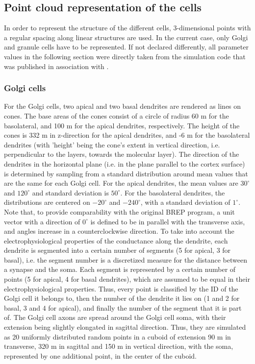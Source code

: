 \documentclass[12pt]{report}
\begin{document}
\subsection{Point cloud representation of the cells}

In order to represent the structure of the different cells, 3-dimensional points with a regular spacing along linear structures are used. In the current case, only Golgi and granule cells have to be represented. If not declared differently, all parameter values in the following section were directly taken from the simulation code that was published in association with \cite{r:Sudha17}.
 

\subsubsection{Golgi cells}
For the Golgi cells, two apical and two basal dendrites are rendered as lines on cones. The base areas of the cones consist of a circle of radius 60 \textmu m for the basolateral, and 100 \textmu m for the apical dendrites, respectively. The height of the cones is 332 \textmu m in z-direction for the apical dendrites, and -6 \textmu m for the basolateral dendrites (with 'height' being the cone's extent in vertical direction, i.e. perpendicular to the layers, towards the molecular layer). The direction of the dendrites in the horizontal plane (i.e. in the plane parallel to the cortex surface) is determined by sampling from a standard distribution around mean values that are the same for each Golgi cell. For the apical dendrites, the mean values are $30^{\circ}$ and $120^{\circ}$ and standard deviation is $50^{\circ}$. For the basolateral dendrites, the distributions are centered on $-20^{\circ}$ and $-240^{\circ}$, with a standard deviation of $1^{\circ}$. Note that, to provide comparability with the original BREP program, a unit vector with a direction of $0^{\circ}$ is defined to be in parallel with the transverse axis, and angles increase in a counterclockwise direction. To take into account the electrophysiological properties of the conductance along the dendrite, each dendrite is segmented into a certain number of segments (5 for apical, 3 for basal), i.e. the segment number is a discretized measure for the distance between a synapse and the soma. Each segment is represented by a certain number of points (5 for apical, 4 for basal dendrites), which are assumed to be equal in their electrophysiological properties. Thus, every point is classified by the ID of the Golgi cell it belongs to, then the number of the dendrite it lies on (1 and 2 for basal, 3 and 4 for apical), and finally the number of the segment that it is part of.
The Golgi cell axons are spread around the Golgi cell soma, with their extension being slightly elongated in sagittal direction. Thus, they are simulated as 20 uniformly distributed random points in a cuboid of extension 90 \textmu m in transverse, 320 \textmu m in sagittal and 150 \textmu m in vertical direction, with the soma, represented by one additional point, in the center of the cuboid.
\end{document}
